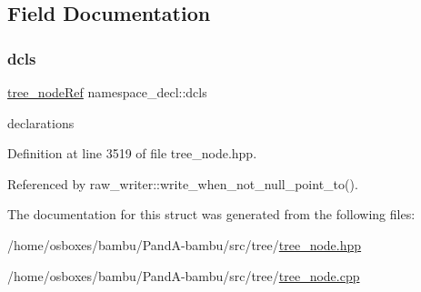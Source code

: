 \subsection{Field Documentation}
\mbox{\label{structnamespace__decl_a012a041c9a99e242e39e9eca5dddb263}} 
\subsubsection{\texorpdfstring{dcls}{dcls}}
{\footnotesize\ttfamily \hyperlink{tree__node_8hpp_a6ee377554d1c4871ad66a337eaa67fd5}{tree\+\_\+node\+Ref} namespace\+\_\+decl\+::dcls}



declarations 



Definition at line 3519 of file tree\+\_\+node.\+hpp.



Referenced by raw\+\_\+writer\+::write\+\_\+when\+\_\+not\+\_\+null\+\_\+point\+\_\+to().



The documentation for this struct was generated from the following files\+:\begin{DoxyCompactItemize}
\item 
/home/osboxes/bambu/\+Pand\+A-\/bambu/src/tree/\hyperlink{tree__node_8hpp}{tree\+\_\+node.\+hpp}\item 
/home/osboxes/bambu/\+Pand\+A-\/bambu/src/tree/\hyperlink{tree__node_8cpp}{tree\+\_\+node.\+cpp}\end{DoxyCompactItemize}
